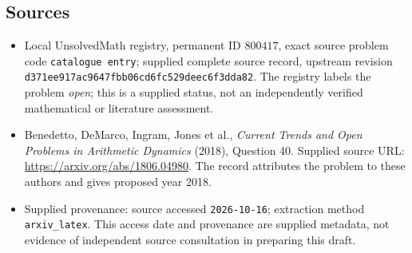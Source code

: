 \documentclass[11pt]{article}
\begin{document}
\subsection{Sources}
\begin{itemize}
\item Local UnsolvedMath registry, permanent ID \(800417\), exact source problem code \texttt{catalogue entry}; supplied complete source record, upstream revision \texttt{d371ee917ac9647fbb06cd6fc529deec6f3dda82}. The registry labels the problem \emph{open}; this is a supplied status, not an independently verified mathematical or literature assessment.
\item Benedetto, DeMarco, Ingram, Jones et al., \emph{Current Trends and Open Problems in Arithmetic Dynamics} (2018), Question 40. Supplied source URL: \url{https://arxiv.org/abs/1806.04980}. The record attributes the problem to these authors and gives proposed year 2018.
\item Supplied provenance: source accessed \texttt{2026-10-16}; extraction method \texttt{arxiv\_latex}. This access date and provenance are supplied metadata, not evidence of independent source consultation in preparing this draft.
\end{itemize}
\end{document}
